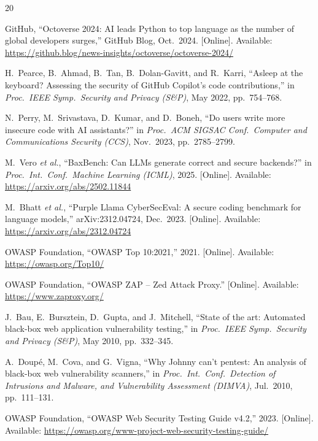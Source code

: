 \documentclass[conference,a4paper]{IEEEtran}
\begin{document}
\begin{thebibliography}{20}

GitHub, ``Octoverse 2024: AI leads Python to top language as the number of global developers surges,'' GitHub Blog, Oct.\ 2024. [Online]. Available: \url{https://github.blog/news-insights/octoverse/octoverse-2024/}

H.~Pearce, B.~Ahmad, B.~Tan, B.~Dolan-Gavitt, and R.~Karri, ``Asleep at the keyboard? Assessing the security of GitHub Copilot's code contributions,'' in \emph{Proc.\ IEEE Symp.\ Security and Privacy (S\&P)}, May 2022, pp.~754--768.

N.~Perry, M.~Srivastava, D.~Kumar, and D.~Boneh, ``Do users write more insecure code with AI assistants?'' in \emph{Proc.\ ACM SIGSAC Conf.\ Computer and Communications Security (CCS)}, Nov.\ 2023, pp.~2785--2799.

M.~Vero \emph{et al.}, ``BaxBench: Can LLMs generate correct and secure backends?'' in \emph{Proc.\ Int.\ Conf.\ Machine Learning (ICML)}, 2025. [Online]. Available: \url{https://arxiv.org/abs/2502.11844}

M.~Bhatt \emph{et al.}, ``Purple Llama CyberSecEval: A secure coding benchmark for language models,'' arXiv:2312.04724, Dec.\ 2023. [Online]. Available: \url{https://arxiv.org/abs/2312.04724}

OWASP Foundation, ``OWASP Top 10:2021,'' 2021. [Online]. Available: \url{https://owasp.org/Top10/}

OWASP Foundation, ``OWASP ZAP -- Zed Attack Proxy.'' [Online]. Available: \url{https://www.zaproxy.org/}

J.~Bau, E.~Bursztein, D.~Gupta, and J.~Mitchell, ``State of the art: Automated black-box web application vulnerability testing,'' in \emph{Proc.\ IEEE Symp.\ Security and Privacy (S\&P)}, May 2010, pp.~332--345.

A.~Doup\'{e}, M.~Cova, and G.~Vigna, ``Why Johnny can't pentest: An analysis of black-box web vulnerability scanners,'' in \emph{Proc.\ Int.\ Conf.\ Detection of Intrusions and Malware, and Vulnerability Assessment (DIMVA)}, Jul.\ 2010, pp.~111--131.

OWASP Foundation, ``OWASP Web Security Testing Guide v4.2,'' 2023. [Online]. Available: \url{https://owasp.org/www-project-web-security-testing-guide/}


\end{thebibliography}
\end{document}
